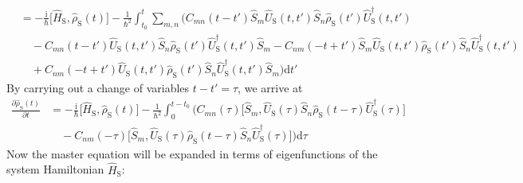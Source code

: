 \documentclass[9pt]{report}
\begin{document}
\begin{align}
&= -\frac{\mathrm{i}}{\hbar}\big[\hat{H}_{\mathrm{S}},\hat{\rho}_{\mathrm{S}}(t)\big]-\frac{1}{\hbar^2}\int_{t_0}^{t}\sum_{m,n}\Big(C_{mn}(t-t')\hat{S}_{m}\hat{U}_{\mathrm{S}}(t,t')\hat{S}_{n}\hat{\rho}_{\mathrm{S}}(t')\hat{U}_{\mathrm{S}}^{\dagger}(t,t')\\
&\quad-C_{mn}(t-t')\hat{U}_{\mathrm{S}}(t,t')\hat{S}_{n}\hat{\rho}_{\mathrm{S}}(t')\hat{U}_{\mathrm{S}}^{\dagger}(t,t')\hat{S}_{m} -C_{nm}(-t+t')\hat{S}_{m}\hat{U}_{\mathrm{S}}(t,t')\hat{\rho}_{\mathrm{S}}(t')\hat{S}_{n}\hat{U}_{\mathrm{S}}^{\dagger}(t,t')\\
&\quad+C_{nm}(-t+t')\hat{U}_{\mathrm{S}}(t,t')\hat{\rho}_{\mathrm{S}}(t')\hat{S}_{n}\hat{U}_{\mathrm{S}}^{\dagger}(t,t')\hat{S}_{m}\Big)\mathrm{d}t'
\end{align}
By carrying out a change of variables $t-t'=\tau$, we arrive at
\begin{align}
\frac{\partial\hat{\rho}_{\mathrm{S}}(t)}{\partial t} &= -\frac{\mathrm{i}}{\hbar}\big[\hat{H}_{\mathrm{S}},\hat{\rho}_{\mathrm{S}}(t)\big]-\frac{1}{\hbar^2}\int_{0}^{t-t_0}\bigg(C_{mn}(\tau)\big[\hat{S}_{m},\hat{U}_{\mathrm{S}}(\tau)\hat{S}_{n}\hat{\rho}_{\mathrm{S}}(t-\tau)\hat{U}_{\mathrm{S}}^{\dagger}(\tau)\big]\\
&\quad-C_{nm}(-\tau)\big[\hat{S}_{m},\hat{U}_{\mathrm{S}}(\tau)\hat{\rho}_{\mathrm{S}}(t-\tau)\hat{S}_{n}\hat{U}_{\mathrm{S}}^{\dagger}(\tau)\big]\bigg)\mathrm{d}\tau
\end{align}
Now the master equation will be expanded in terms of eigenfunctions of the system Hamiltonian $\hat{H}_{\mathrm{S}}$:
\end{document}
